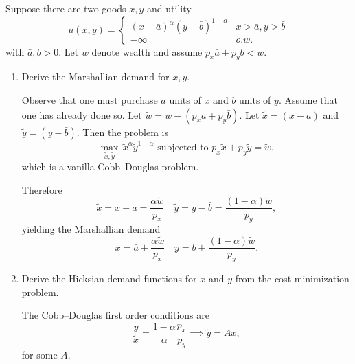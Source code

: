 \documentclass[11pt]{article}
\begin{document}
Suppose there are two goods $x,y$ and utility \[
u(x,y) = \begin{cases}
     (x-\bar a)^\alpha (y-\bar b)^{1- \alpha} & x > \bar a, y > \bar b \\
     -\infty & o.w.
\end{cases}
\]
with $\bar a, \bar b > 0.$ Let $w$ denote wealth and assume $p_x \bar a + p_y \bar b < w$.  
\begin{enumerate}
    \item Derive the Marshallian demand for $x,y$. 
    \begin{sol}
        Observe that one must purchase $\bar a$ units of $x$ and $\bar b$ units of $y$. Assume that one has already done so. Let $\tilde w = w - (p_x \bar a + p_y \bar b)$. Let $\tilde x = (x-\bar a)$ and $\tilde y = (y-\bar b)$. Then the problem is \[
        \max_{\tilde x, \tilde y} \, \tilde x ^{\alpha} \tilde y^{1-\alpha}\text{ subjected to } p_x \tilde x + p_y\tilde y = \tilde w,
        \]
        which is a vanilla Cobb--Douglas problem.
        
        Therefore \[
        \tilde x = x-\bar a = \frac{\alpha \tilde w}{p_x}\quad \tilde y = y-\bar b = \frac{(1-\alpha)\tilde w}{p_y},
        \]
        yielding the Marshallian demand \[
        x = \bar a + \frac{\alpha \tilde w}{p_x} \quad y = \bar b + \frac{(1-\alpha) \tilde w}{p_y}.
        \]        
    \end{sol}
    
    \item Derive the Hicksian demand functions for $x$ and $y$ from the cost minimization problem. 
    \begin{sol}
        The Cobb--Douglas first order conditions are \[
        \frac{\tilde y}{\tilde x} = \frac{1- \alpha}{\alpha}\frac{p_x}{p_y} \implies \tilde y = A \tilde x,
        \]
        for some $A$.
        

\end{sol}
\end{enumerate}
\end{document}
